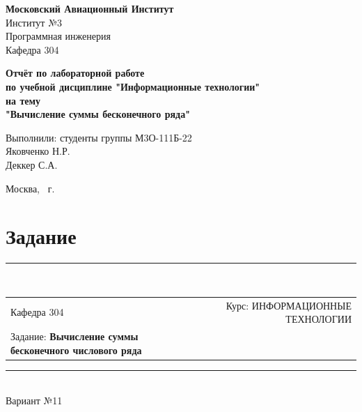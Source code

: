 \documentclass[a4paper]{article}
\begin{document}
	\def\contentsname{Содержание}
	
	\begin{titlepage}
		\begin{center}
			\textbf{Московский Авиационный Институт\\[10mm]}
				Институт №3 \\
				Программная инженерия \\
				Кафедра 304 \\
			
			\vfill
			
			\textbf{Отчёт по лабораторной работе \\ 
				по учебной дисциплине "Информационные технологии" \\
				на тему \\
				"Вычисление суммы бесконечного ряда" \\ [50mm]
			}
		\end{center}
		
		\hfill
		\begin{minipage}{.5\textwidth}
			Выполнили: студенты группы М3О-111Б-22 \\ [2mm] 
			Яковченко Н.Р. \\
			Деккер С.А. \\
		\end{minipage}%
		\vfill
		\begin{center}
			Москва, \the\year\ г.
		\end{center}
	\end{titlepage}
	
	\tableofcontents
	\newpage
	
	\section{Задание}
	
	\begin{center}
	\rule{\textwidth}{1pt} \\[2mm]
		\begin{tabular}{ lllll }
			\multicolumn{1}{l}{Кафедра 304} & \multicolumn{4}{r}{Курс: ИНФОРМАЦИОННЫЕ ТЕХНОЛОГИИ} \\[2mm]
			\multicolumn{3}{l}{Задание: \textbf{Вычисление суммы бесконечного числового ряда}} & & \\[2mm]
		\end{tabular}
	\rule{\textwidth}{1pt} \\[2mm]
	Вариант №11
	\end{center}
	
\end{document}
